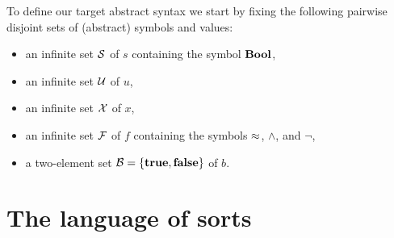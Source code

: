 To define our target abstract syntax we start by fixing the following pairwise disjoint
sets of (abstract) symbols and values:
\begin{itemize}
\item
an infinite set $\mathcal{S}$ of  $s$ 
containing the symbol $\textbf{Bool}$,

\item
an infinite set $\mathcal{U}$ of  $u$,

\item
an infinite set $\mathcal{X}$ of  $x$,

\item
an infinite set $\mathcal{F}$ of  $f$
containing the symbols $\approx$, $\land$, and $\lnot$,




\item
a two-element set $\mathcal{B} = \{\textbf{true}, \textbf{false}\}$ of  $b$.





\end{itemize}


\section{The language of sorts}

